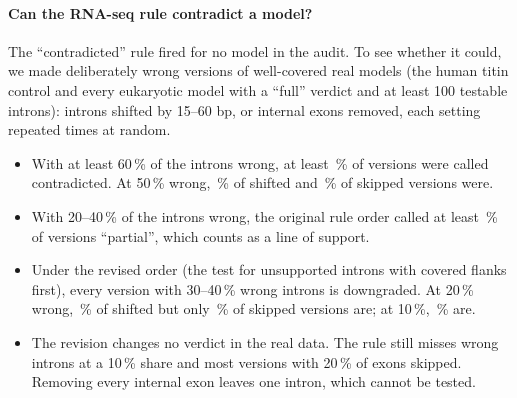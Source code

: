 \documentclass[11pt]{article}
\begin{document}
\paragraph{Can the RNA-seq rule contradict a model?} The ``contradicted'' rule fired for no model in the audit. To see
whether it could, we made deliberately wrong versions of  well-covered real models (the human titin
control and every eukaryotic model with a ``full'' verdict and at least 100 testable introns): introns shifted by
15--60 bp, or internal exons removed, each setting repeated  times at random.
\begin{itemize}[leftmargin=*]
\item With at least 60\,\% of the introns wrong, at least \,\% of versions were called
contradicted. At 50\,\% wrong, \,\% of shifted and \,\% of skipped versions were.
\item With 20--40\,\% of the introns wrong, the original rule order called at least \,\% of
versions ``partial'', which counts as a line of support.
\item Under the revised order (the test for unsupported introns with covered flanks first), every version with 30--40\,\%
wrong introns is downgraded. At 20\,\% wrong, \,\% of shifted but only \,\% of
skipped versions are; at 10\,\%, \,\% are.
\item The revision changes no verdict in the real data. The rule still misses wrong introns at a 10\,\% share and most
versions with 20\,\% of exons skipped. Removing every internal exon leaves one intron, which cannot be tested.
\end{itemize}
\end{document}
